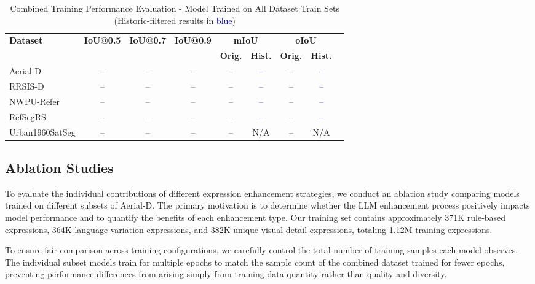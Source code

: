 \begin{table*}[t]
\centering
\caption{Combined Training Performance Evaluation - Model Trained on All Dataset Train Sets (Historic-filtered results in \textcolor{blue}{blue})}
\label{tab:combined_training_results}
\begin{tabular}{@{}lcccccccc@{}}
\toprule
\textbf{Dataset} & \textbf{IoU@0.5} & \textbf{IoU@0.7} & \textbf{IoU@0.9} & \multicolumn{2}{c}{\textbf{mIoU}} & \multicolumn{2}{c}{\textbf{oIoU}} \\
\cmidrule(lr){5-6} \cmidrule(lr){7-8}
 & & & & \textbf{Orig.} & \textbf{Hist.} & \textbf{Orig.} & \textbf{Hist.} \\
\midrule
Aerial-D & -- & -- & -- & -- & \textcolor{blue}{--} & -- & \textcolor{blue}{--} \\
RRSIS-D & -- & -- & -- & -- & \textcolor{blue}{--} & -- & \textcolor{blue}{--} \\
NWPU-Refer & -- & -- & -- & -- & \textcolor{blue}{--} & -- & \textcolor{blue}{--} \\
RefSegRS & -- & -- & -- & -- & \textcolor{blue}{--} & -- & \textcolor{blue}{--} \\
Urban1960SatSeg & -- & -- & -- & -- & N/A & -- & N/A \\
\bottomrule
\end{tabular}
\end{table*}


\subsection{Ablation Studies}
\label{subsec:ablation_studies}

To evaluate the individual contributions of different expression enhancement strategies, we conduct an ablation study comparing models trained on different subsets of Aerial-D. The primary motivation is to determine whether the LLM enhancement process positively impacts model performance and to quantify the benefits of each enhancement type. Our training set contains approximately 371K rule-based expressions, 364K language variation expressions, and 382K unique visual detail expressions, totaling 1.12M training expressions.

To ensure fair comparison across training configurations, we carefully control the total number of training samples each model observes. The individual subset models train for multiple epochs to match the sample count of the combined dataset trained for fewer epochs, preventing performance differences from arising simply from training data quantity rather than quality and diversity.

